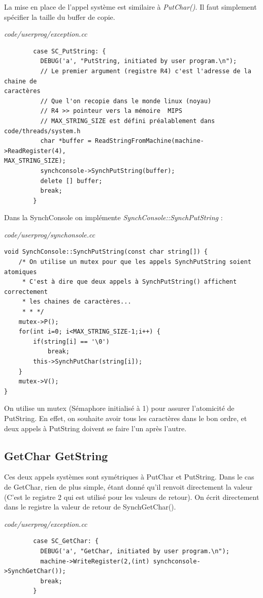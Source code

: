 \documentclass[a4paper,10pt]{article}
\begin{document}
La mise en place de l'appel système est similaire à \textit{PutChar()}. Il faut
simplement spécifier la taille du buffer de copie.

\textit{code/userprog/exception.cc}
\begin{lstlisting}
        case SC_PutString: {
          DEBUG('a', "PutString, initiated by user program.\n");
          // Le premier argument (registre R4) c'est l'adresse de la chaine de
caractères
          // Que l'on recopie dans le monde linux (noyau)
          // R4 >> pointeur vers la mémoire  MIPS
          // MAX_STRING_SIZE est défini préalablement dans code/threads/system.h
          char *buffer = ReadStringFromMachine(machine->ReadRegister(4),
MAX_STRING_SIZE);
          synchconsole->SynchPutString(buffer);
          delete [] buffer;
          break;
        }
\end{lstlisting}


Dans la SynchConsole on implémente \textit{SynchConsole::SynchPutString} :

\textit{code/userprog/synchonsole.cc}
\begin{lstlisting}
void SynchConsole::SynchPutString(const char string[]) {
    /* On utilise un mutex pour que les appels SynchPutString soient atomiques
     * C'est à dire que deux appels à SynchPutString() affichent correctement
     * les chaines de caractères...
     * * */
    mutex->P();
    for(int i=0; i<MAX_STRING_SIZE-1;i++) {
        if(string[i] == '\0')
            break;
        this->SynchPutChar(string[i]);
    }
    mutex->V();
}
\end{lstlisting}

On utilise un mutex (Sémaphore initialisé à 1) pour assurer l'atomicité de
PutString. En effet, on souhaite avoir tous les caractères dans le bon ordre,
et deux appels à PutString doivent se faire l'un après l'autre.

\subsection{GetChar GetString}

Ces deux appels systèmes sont symétriques à PutChar et PutString. Dans le cas
de GetChar, rien de plus simple, étant donné qu'il renvoit directement la
valeur (C'est le registre 2 qui est utilisé pour les valeurs de retour). On
écrit directement dans le registre la valeur de retour de SynchGetChar().

\textit{code/userprog/exception.cc}
\begin{lstlisting}
        case SC_GetChar: {
          DEBUG('a', "GetChar, initiated by user program.\n");
          machine->WriteRegister(2,(int) synchconsole->SynchGetChar());
          break;
        }
\end{lstlisting}
\end{document}
